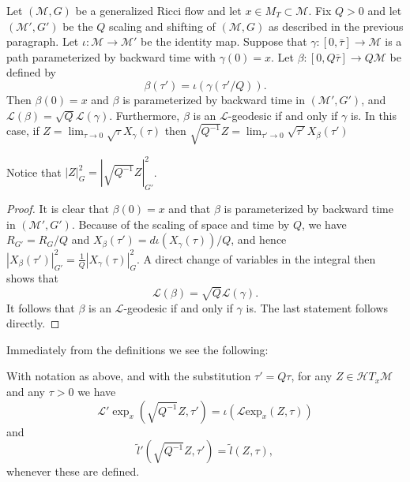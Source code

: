 \begin{lemma}\label{lem:l-length-rescaling}
\label{Lrescale}
Let $({\mathcal M},G)$ be a generalized Ricci flow and let $x\in
M_T\subset {\mathcal M}$. Fix $Q>0$ and let $({\mathcal M}',G')$ be
the $Q$ scaling and shifting of $({\mathcal M},G)$ as described in
the previous paragraph. Let $\iota\colon{\mathcal M}\to {\mathcal
M}'$ be the identity map. Suppose that $\gamma\colon [0,\bar\tau]\to
{\mathcal M}$ is a path parameterized by backward time with
$\gamma(0)=x$. Let $\beta\colon [0,Q\bar\tau]\to Q{\mathcal M}$ be
defined by
$$\beta(\tau')=\iota(\gamma(\tau'/Q)).$$
Then $\beta(0)=x$ and $\beta$ is parameterized by backward time in
$({\mathcal M}',G')$, and ${\mathcal L}(\beta)=\sqrt{Q}{\mathcal
L}(\gamma)$. Furthermore, $\beta$ is an ${\mathcal L}$-geodesic if
and only if $\gamma$ is. In this case, if $Z=\lim_{\tau\rightarrow 0}\sqrt{\tau}X_\gamma(\tau)$ then
$\sqrt{Q^{-1}}Z=\lim_{\tau'\rightarrow
0}\sqrt{\tau'}X_\beta(\tau')$
\end{lemma}

\begin{remark}\label{rem:rescaling-norm-identity}
Notice that $|Z|_G^2=|\sqrt{Q^{-1}}Z|^2_{G'}$.
\end{remark}

\begin{proof}
It is clear that $\beta(0)=x$ and that $\beta$ is parameterized by
backward time in $({\mathcal M}',G')$. Because of the scaling of
space and time by $Q$, we have $R_{G'}=R_G/Q$ and
$X_\beta(\tau')=d\iota(X_\gamma(\tau))/Q$, and hence
$|X_\beta(\tau')|^2_{G'}=\frac{1}{Q}|X_\gamma(\tau)|^2_{G}$. A
direct change of variables in the integral then shows that
$${\mathcal L}(\beta)=\sqrt{Q}{\mathcal L}(\gamma).$$
It follows that $\beta$ is an ${\mathcal L}$-geodesic if and only if
$\gamma$ is. The last statement follows directly.
\end{proof}

Immediately from the definitions we see the following:

\begin{corollary}\label{cor:l-exponential-rescaling-identity}
\label{COR}
With notation as above, and with the substitution $\tau'=Q\tau$, for
any $Z\in {\mathcal H}T_x{\mathcal M}$ and any $\tau>0$ we have
$${\mathcal
L}'\exp_x(\sqrt{Q^{-1}}Z,\tau')=\iota({\mathcal L}\mathrm{exp}_x(Z,\tau))$$ and
$$ \tilde l'(\sqrt{Q^{-1}}Z,\tau')=\tilde l(Z,\tau),$$
whenever these are defined.
\end{corollary}




